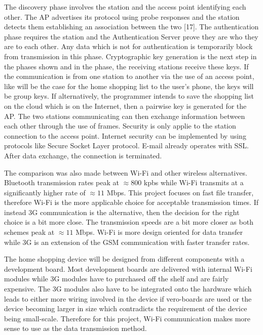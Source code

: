 The discovery phase involves the station and the access point identifying each other. The AP advertises its protocol using probe responses and the station detects them establishing an association between the two [17]. The authentication phase requires the station and the Authentication Server prove they are who they are to each other. Any data which is not for authentication is temporarily block from transmission in this phase. Cryptographic key generation is the next step in the phases shown and in the phase, the receiving stations receive these keys. If the communication is from one station to another via the use of an access point, like will be the case for the home shopping list to the user's phone, the keys will be group keys. If alternatively, the programmer intends to save the shopping list on the cloud which is on the Internet, then a pairwise key is generated for the AP. The two stations communicating can then exchange information between each other through the use of frames. Security is only applie to the station connection to the access point. Internet security can be implemented by using protocols like Secure Socket Layer protocol. E-mail already operates with SSL. After data exchange, the connection is terminated.

The comparison was also made between Wi-Fi and other wireless alternatives. Bluetooth transmission rates peak at  $\approx 800$ kpbs while Wi-Fi transmits at a significantly higher rate of $\approx 11$ Mbps. This project focuses on fast file transfer, therefore Wi-Fi is the more applicable choice for acceptable transmission times. If instead 3G communication is the alternative, then the decision for the right choice is a bit more close. The transmission speeds are a bit more closer as both schemes peak at $\approx 11$ Mbps. Wi-Fi is more design oriented for data transfer while 3G is an extension of the GSM communication with faster transfer rates. 

The home shopping device will be designed from different components with a development board. Most development boards are delivered with internal Wi-Fi modules while 3G modules have to purchased off the shelf and are fairly expensive. The 3G modules also have to be integrated onto the hardware which leads to either more wiring involved in the device if vero-boards are used or the device becoming larger in size which contradicts the requirement of the device being small-scale. Therefore for this project, Wi-Fi communication makes more sense to use as the data transmission method. 

